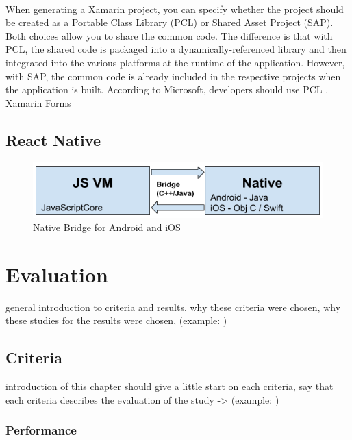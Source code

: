 \documentclass[Bachelor,BIF,english]{twbook}
\begin{document}
\\[\baselineskip]
When generating a Xamarin project, you can specify whether the project should be created as a Portable Class Library (PCL) or Shared Asset Project (SAP). Both choices allow you to share the common code. The difference is that with PCL, the shared code is packaged into a dynamically-referenced library and then integrated into the various platforms at the runtime of the application. However, with SAP, the common code is already included in the respective projects when the application is built. According to Microsoft, developers should use PCL \cite[p.~16]{ZubaBernhard2017EdPb} \cite[p.~8-9]{Dickson_2013}.
\\[\baselineskip] 
Xamarin Forms \cite[p.~17]{ZubaBernhard2017EdPb}

\section{React Native}
\cite{Hansson_Vidhall_2016} \cite{Danielsson_2016} \cite[p.~21-32]{ZubaBernhard2017EdPb}
\cite[p.~14-20]{ZubaBernhard2017EdPb}
\begin{figure}[!htbp]
\centering
\includegraphics[width=0.75\linewidth]{PICs/Bachelor1_NativeBridge.png}
\caption{Native Bridge for Android and iOS \cite{PicReactNativeBridge} \cite[p.~28]{ZubaBernhard2017EdPb}}\label{Fig4}
\end{figure}

\chapter{Evaluation}
general introduction to criteria and results, why these criteria were chosen, why these studies for the results were chosen, (example: \cite[p.~24]{Danielsson_2016})

\section{Criteria}
introduction of this chapter should give a little start on each criteria, say that each criteria describes the evaluation of the study -> (example: \cite[p.~24]{Danielsson_2016})

\subsection{Performance}
\cite[p.~25-26]{Danielsson_2016} \cite[p.~30]{Axelsson2016} \cite[p.~29-31]{Hansson_Vidhall_2016}
\end{document}

